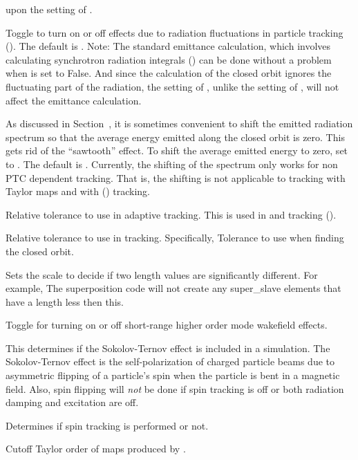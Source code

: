 {\begin{description}
upon the setting of .
%
\item[\vn{radiation_fluctuations_on}] \Newline
Toggle to turn on or off effects due to radiation fluctuations in particle tracking
().  The default is . Note: The standard \bmad emittance calculation,
which involves calculating synchrotron radiation integrals () can be done without
a problem when  is set to False. And since the calculation of the closed orbit
ignores the fluctuating part of the radiation, the setting of , unlike the
setting of , will not affect the emittance calculation.
%
\item[\vn{radiation_zero_average}] \Newline
As discussed in Section~, it is sometimes convenient to shift the emitted radiation
spectrum so that the average energy emitted along the closed orbit is zero. This gets rid of the ``sawtooth''
effect. To shift the average emitted energy to zero, set  to . The
default is . Currently, the shifting of the spectrum only works for non PTC
dependent tracking. That is, the shifting is not applicable to tracking with Taylor maps and with
 () tracking.
%
\item[\vn{rel_tol_adaptive_tracking}] \Newline
Relative tolerance to use in adaptive tracking. This is used in  and
 tracking ().
%
\item[\vn{rel_tol_tracking}] \Newline
Relative tolerance to use in tracking. Specifically, Tolerance to use when finding the closed orbit.
%
\item[\vn{significant_length}] \Newline
Sets the scale to decide if two length values are significantly different. For example, The
superposition code will not create any super_slave elements that have a length less then this.
%
\item[\vn{sr_wakes_on}] \Newline
Toggle for turning on or off short-range higher order mode wakefield effects.
%
\item[\vn{spin_sokolov_ternov_flipping_on}] \Newline
This determines if the Sokolov-Ternov effect is included in a simulation.  The Sokolov-Ternov
effect\cite{b:barber99} is the self-polarization of charged particle beams due to asymmetric flipping
of a particle's spin when the particle is bent in a magnetic field. Also, spin flipping will {\em
not} be done if spin tracking is off or both radiation damping and excitation are off.
%
\item[\vn{spin_tracking_on}] \Newline
Determines if spin tracking is performed or not.
%
\item[\vn{taylor_order}] \Newline
Cutoff Taylor order of maps produced by .
\end{description}

}

